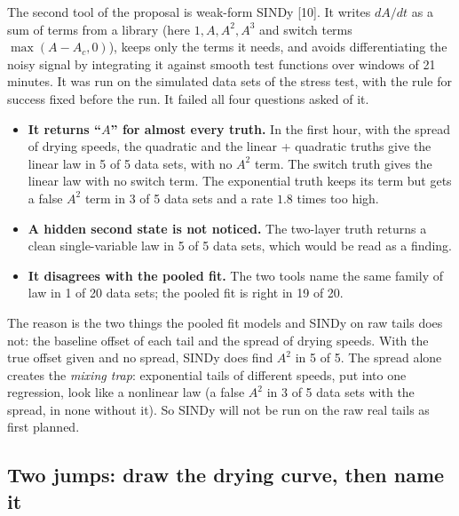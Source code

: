 \documentclass[11pt,a4paper]{article}
\begin{document}
The second tool of the proposal is weak-form SINDy [10]. It writes $dA/dt$ as a sum of terms from a library (here
$1, A, A^{2}, A^{3}$ and switch terms $\max(A - A_{c}, 0)$), keeps only the terms it needs, and avoids differentiating
the noisy signal by integrating it against smooth test functions over windows of 21 minutes. It was run on the
simulated data sets of the stress test, with the rule for success fixed before the run. It failed all four questions
asked of it.
\begin{itemize}
\item \textbf{It returns ``$A$'' for almost every truth.} In the first hour, with the spread of drying speeds, the
quadratic and the linear + quadratic truths give the linear law in 5 of 5 data sets, with no $A^{2}$ term. The switch
truth gives the linear law with no switch term. The exponential truth keeps its term but gets a false $A^{2}$ term in
3 of 5 data sets and a rate $1.8$ times too high.
\item \textbf{A hidden second state is not noticed.} The two-layer truth returns a clean single-variable law in 5 of
5 data sets, which would be read as a finding.
\item \textbf{It disagrees with the pooled fit.} The two tools name the same family of law in 1 of 20 data sets; the
pooled fit is right in 19 of 20.
\end{itemize}
The reason is the two things the pooled fit models and SINDy on raw tails does not: the baseline offset of each tail
and the spread of drying speeds. With the true offset given and no spread, SINDy does find $A^{2}$ in 5 of 5. The
spread alone creates the \emph{mixing trap}: exponential tails of different speeds, put into one regression, look
like a nonlinear law (a false $A^{2}$ in 3 of 5 data sets with the spread, in none without it). So SINDy will not be
run on the raw real tails as first planned.

\subsection{Two jumps: draw the drying curve, then name it}
\label{sec:twojumps}
\end{document}
